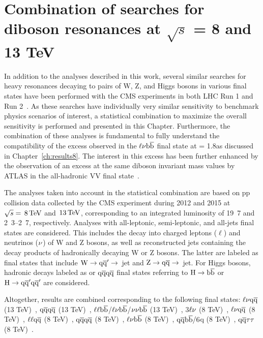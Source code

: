\chapter{Combination of searches for diboson resonances at $\sqrt{s}$ = 8 and 13 TeV}
\label{ch:combination}

In addition to the analyses described in this work, several similar searches for heavy resonances decaying to pairs of W, Z, and Higgs bosons in various final states have been performed with the CMS experiments in both LHC Run 1 and Run 2~\cite{CMS-PAS-EXO-15-002,Khachatryan:2016cfx,Khachatryan:2014gha, Khachatryan:2014hpa, Khachatryan:2015bma, Khachatryan:2014xja,Khachatryan:2016yji,Khachatryan:2015ywa}.
As these searches have individually very similar sensitivity to benchmark physics scenarios of interest, a statistical combination to maximize the overall sensitivity is performed and presented in this Chapter.
Furthermore, the combination of these analyses is fundamental to fully understand the compatibility of the excess observed in the $\ell\nu{\mathrm{b}\overline{\mathrm{b}}}$ final state at \mWH = 1.8\TeV as discussed in Chapter~\ref{ch:results8}.
The interest in this excess has been further enhanced by the observation of an excess at the same diboson invariant mass values by ATLAS in the all-hadronic VV final state~\cite{Aad:2015owa}.

The analyses taken into account in the statistical combination are based on pp collision data collected by the CMS experiment during 2012 and 2015 at $\sqrt{s} = \text{\,8}{\ensuremath{\,\text{Te\hspace{-.08em}V}}}$ and $\text{\,13}{\ensuremath{\,\text{Te\hspace{-.08em}V}}}$, corresponding to an integrated luminosity of \unit{19.7}{\fbinv} and \unit{2.3}--\unit{2.7}{\fbinv}, respectively.
Analyses with all-leptonic, semi-leptonic, and all-jets final states are considered. This includes the decay into charged leptons ($\ell$) and neutrinos ($\nu$) of W and Z bosons, as well as reconstructed jets containing the decay products of hadronically decaying W or Z bosons. The latter are labeled as \qqbar final states that include $\rm W\to\mathrm{q}\overline{\mathrm{q}}'\to$~jet and $\rm Z\to\mathrm{q}\overline{\mathrm{q}}\to$~jet. For Higgs bosons, hadronic decays labeled as \bbbar or $\mathrm{q}\overline{\mathrm{q}}\mathrm{q}\overline{\mathrm{q}}$ final states referring to $\rm H\to{\mathrm{b}\overline{\mathrm{b}}}$ or $\rm H\to\mathrm{q}\overline{\mathrm{q}}'\mathrm{q}\overline{\mathrm{q}}'$ are considered.

Altogether, results are combined corresponding to the following final states: $\ell \nu \mathrm{q}\overline{\mathrm{q}}$ (13 TeV)~\cite{CMS-PAS-EXO-15-002}, $\mathrm{q}\overline{\mathrm{q}} \mathrm{q}\overline{\mathrm{q}}$ (13 TeV)~\cite{CMS-PAS-EXO-15-002},
$\ell \ell {\mathrm{b}\overline{\mathrm{b}}}$/$\ell \nu {\mathrm{b}\overline{\mathrm{b}}}$/$\nu \nu {\mathrm{b}\overline{\mathrm{b}}}$ (13 TeV)~\cite{Khachatryan:2016cfx},
3$\ell\nu$ (8 TeV)~\cite{Khachatryan:2014xja}, 
$\ell \nu \mathrm{q}\overline{\mathrm{q}}$ (8 TeV)~\cite{Khachatryan:2014gha}, $\ell\ell \mathrm{q}\overline{\mathrm{q}}$ (8 TeV)~\cite{Khachatryan:2014gha}, 
$\mathrm{q}\overline{\mathrm{q}} \mathrm{q}\overline{\mathrm{q}}$ (8 TeV)~\cite{Khachatryan:2014hpa}, 
$\ell \nu {\mathrm{b}\overline{\mathrm{b}}}$ (8 TeV)~\cite{Khachatryan:2016yji}, $\mathrm{q}\overline{\mathrm{q}}{\mathrm{b}\overline{\mathrm{b}}}/6$q (8 TeV)~\cite{Khachatryan:2015bma}, 
$\mathrm{q}\overline{\mathrm{q}} \tau\tau $ (8 TeV)~\cite{Khachatryan:2015ywa}.

